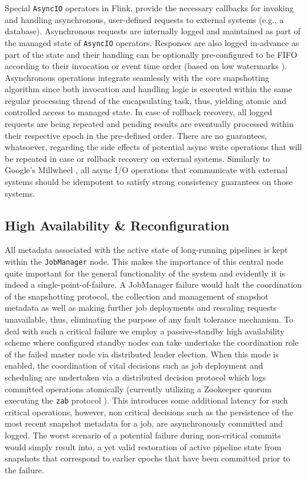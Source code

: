 Special \texttt{AsyncIO} operators in Flink, provide the necessary callbacks for invoking and handling asynchronous, user-defined requests to external systems (e.g., a database). Asynchronous requests are internally logged and maintained as part of the managed state of \texttt{AsyncIO} operators. Responses are also logged in-advance as part of the state and their handling can be optionally pre-configured to be FIFO according to their invocation or event time order (based on low watermarks \cite{millwheel,akidau2015dataflow,li2008out}). Asynchronous operations integrate seamlessly with the core snapshotting algorithm since both invocation and handling logic is executed within the same regular processing thread of the encapsulating task, thus, yielding atomic and controlled access to managed state. In case of rollback recovery, all logged requests are being repeated and pending results are eventually processed within their respective epoch in the pre-defined order. There are no guarantees, whatsoever, regarding the side effects of potential async write operations that will be repeated in case or rollback recovery on external systems. Similarly to Google's Millwheel \cite{millwheel},  all async I/O operations that communicate with external systems should be idempotent to satisfy strong consistency guarantees on those systems.

\subsection{High Availability \& Reconfiguration}

All metadata associated with the active state of long-running pipelines is kept within the \texttt{JobManager} node. This makes the importance of this central node quite important for the general functionality of the system and evidently it is indeed a single-point-of-failure. A JobManager failure would halt the coordination of the snapshotting protocol, the collection and management of snapshot metadata as well as making further job deployments and rescaling requests unavailable, thus, eliminating the purpose of any fault tolerance mechanism. To deal with such a critical failure we employ a passive-standby high availability scheme where configured standby nodes can take undertake the coordination role of the failed master node via distributed leader election. When this mode is enabled, the coordination of vital decisions such as job deployment and scheduling are undertaken via a distributed decision protocol which logs committed operations atomically (currently utilizing a Zookeeper quorum executing the \texttt{zab} protocol \cite{hunt2010zookeeper}). This introduces some additional latency for such critical operations, however, non critical decisions such as the persistence of the most recent snapshot metadata for a job, are asynchronously committed and logged. The worst scenario of a potential failure during non-critical commits would simply result into, a yet valid restoration of active pipeline state from snapshots that correspond to earlier epochs that have been committed prior to the failure.

	